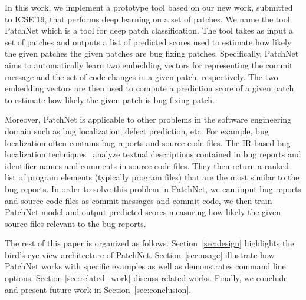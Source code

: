 In this work, we implement a prototype tool based on our new work, submitted to ICSE'19, that performs deep learning on a set of patches. We name the tool PatchNet which is a tool for deep patch classification. The tool takes as input a set of patches and outputs a list of predicted scores used to estimate how likely the given patches the given patches are bug fixing patches. Specifically, PatchNet aims to automatically learn two embedding vectors for representing the commit message and the set of code changes in a given patch, respectively. The two embedding vectors are then used to compute a prediction score of a given patch to estimate how likely the given patch is bug fixing patch.

Moreover, PatchNet is applicable to other problems in the software engineering domain such as bug localization, defect prediction, etc. For example, bug localization often contains bug reports and source code files. The IR-based bug localization techniques~\cite{rao2011retrieval, sisman2012incorporating} analyze textual descriptions contained in bug reports and identifier names and comments in source code files. They then return a ranked list of program elements (typically program files) that are the most similar to the bug reports. In order to solve this problem in PatchNet, we can input bug reports and source code files as commit messages and commit code, we then train PatchNet model and output predicted scores measuring how likely the given source files relevant to the bug reports. 

The rest of this paper is organized as
follows. Section~\ref{sec:design} highlights the bird's-eye view architecture of PatchNet. Section~\ref{sec:usage} illustrate how PatchNet works with specific examples as well as demonstrates command line options. Section \ref{sec:related_work} discuss related works. Finally, we conclude and present future work in  Section~\ref{sec:conclusion}.






